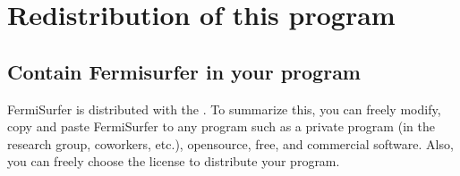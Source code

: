 \documentclass[letterpaper,10pt,pdftex,openany,english]{sphinxmanual}
\begin{document}
\sphinxstepscope


\chapter{Re\sphinxhyphen{}distribution of this program}
\label{\detokenize{copy:re-distribution-of-this-program}}\label{\detokenize{copy::doc}}

\section{Contain Fermisurfer in your program}
\label{\detokenize{copy:contain-fermisurfer-in-your-program}}
\sphinxAtStartPar
FermiSurfer is distributed with the {\hyperref[\detokenize{copy:mitlicense}]{}}.
To summarize this, you can freely modify, copy and paste FermiSurfer to any program
such as a private program (in the research group, co\sphinxhyphen{}workers, etc.),
open\sphinxhyphen{}source, free, and commercial software.
Also, you can freely choose the license to distribute your program.
\end{document}
